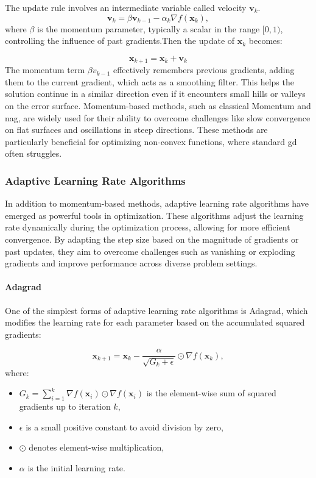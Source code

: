 The update rule involves an intermediate variable called velocity $\mathbf{v}_k$.
\begin{equation}
   \mathbf{v}_k = \beta \mathbf{v}_{k-1} - \alpha_k \nabla f(\mathbf{x}_k),
   \label{eq:momentum_v}
\end{equation}
where $\beta$ is the momentum parameter, typically a scalar in the range \( [0, 1) \), controlling the influence of past gradients.Then the update of $\mathbf{x}_k$ becomes:

\begin{equation}
\mathbf{x}_{k+1} = \mathbf{x}_k + \mathbf{v}_k
\label{eq:momentum_update}
\end{equation}
The momentum term $\beta v_{k-1}$ effectively remembers previous gradients, adding them to the current gradient, which acts as a smoothing filter. This helps the solution continue in a similar direction even if it encounters small hills or valleys on the error surface. Momentum-based methods, such as classical Momentum and \ac{nag}, are widely used for their ability to overcome challenges like slow convergence on flat surfaces and oscillations in steep directions. These methods are particularly beneficial for optimizing non-convex functions, where standard \ac{gd} often struggles.

\subsubsection{Adaptive Learning Rate Algorithms}
\label{subsubsection:adaptive_learning_rates}
In addition to momentum-based methods, adaptive learning rate algorithms have emerged as powerful tools in optimization. These algorithms adjust the learning rate dynamically during the optimization process, allowing for more efficient convergence. By adapting the step size based on the magnitude of gradients or past updates, they aim to overcome challenges such as vanishing or exploding gradients and improve performance across diverse problem settings.

\paragraph{Adagrad}
One of the simplest forms of adaptive learning rate algorithms is Adagrad, which modifies the learning rate for each parameter based on the accumulated squared gradients:

\[
\mathbf{x}_{k+1} = \mathbf{x}_k - \frac{\alpha}{\sqrt{G_k + \epsilon}} \odot \nabla f(\mathbf{x}_k),
\]
where:
\begin{itemize}
    \item \( G_k = \sum_{i=1}^k \nabla f(\mathbf{x}_i) \odot \nabla f(\mathbf{x}_i) \) is the element-wise sum of squared gradients up to iteration \( k \),
    \item \( \epsilon \) is a small positive constant to avoid division by zero,
    \item \( \odot \) denotes element-wise multiplication,
    \item \( \alpha \) is the initial learning rate.
\end{itemize}

